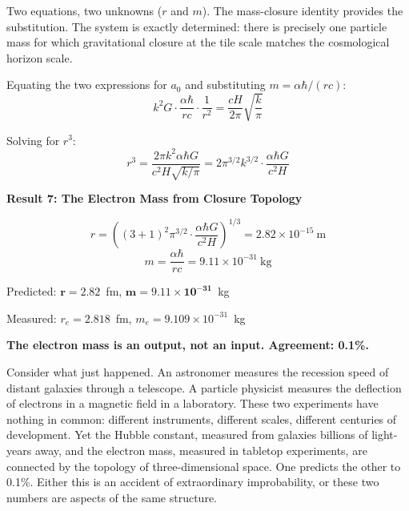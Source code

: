 \documentclass[aps,prd,preprint,superscriptaddress,showpacs,preprintnumbers,amsmath,amssymb,nofootinbib]{revtex4-2}
\begin{document}
Two equations, two unknowns ($r$ and $m$). The mass-closure identity provides the substitution. The system is exactly determined: there is precisely one particle mass for which gravitational closure at the tile scale matches the cosmological horizon scale.

Equating the two expressions for $a_0$ and substituting $m = \alpha\hbar/(rc)$:
\begin{equation}
k^2 G \cdot \frac{\alpha\hbar}{rc} \cdot \frac{1}{r^2} = \frac{cH}{2\pi} \sqrt{\frac{k}{\pi}}
\end{equation}

Solving for $r^3$:
\begin{equation}
r^3 = \frac{2\pi k^2 \alpha \hbar G}{c^2 H \sqrt{k/\pi}} = 2\pi^{3/2} k^{3/2} \cdot \frac{\alpha \hbar G}{c^2 H}
\end{equation}

\vspace{1.5em}
\noindent
\colorbox{resultgreen}{\parbox{\dimexpr\textwidth-2\fboxsep\relax}{%
\vspace{0.8em}
\centering
\textbf{\large Result 7: The Electron Mass from Closure Topology}

\vspace{0.5em}
\boldmath
\begin{equation}
r = \left( (3{+}1)^2 \pi^{3/2} \cdot \frac{\alpha \hbar G}{c^2 H} \right)^{1/3} = 2.82 \times 10^{-15}~\text{m}
\end{equation}
\begin{equation}
m = \frac{\alpha \hbar}{rc} = 9.11 \times 10^{-31}~\text{kg}
\end{equation}
\unboldmath

\vspace{0.3em}
Predicted: $\bm{r = 2.82}$~fm, $\bm{m = 9.11 \times 10^{-31}}$~kg

Measured: $r_e = 2.818$~fm, $m_e = 9.109 \times 10^{-31}$~kg

\textbf{The electron mass is an output, not an input. Agreement: 0.1\%.}
\vspace{0.5em}
}}
\vspace{1cm}

Consider what just happened. An astronomer measures the recession speed of distant galaxies through a telescope. A particle physicist measures the deflection of electrons in a magnetic field in a laboratory. These two experiments have nothing in common: different instruments, different scales, different centuries of development. Yet the Hubble constant, measured from galaxies billions of light-years away, and the electron mass, measured in tabletop experiments, are connected by the topology of three-dimensional space. One predicts the other to 0.1\%. Either this is an accident of extraordinary improbability, or these two numbers are aspects of the same structure.
\end{document}
